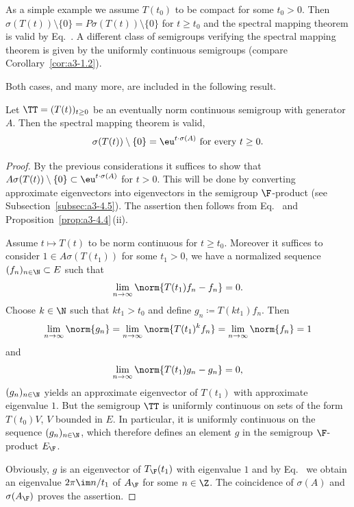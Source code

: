 As a simple example we assume $T(t_{0})$ to be compact for some $t_{0} > 0$.
Then $\sigma(T(t)) \setminus \{0\} = P\sigma(T(t)) \setminus \{0\}$ for $t \geq t_{0}$ and the spectral mapping theorem is valid by Eq.~.
A different class of semigroups verifying the spectral mapping theorem is given by the uniformly continuous semigroups (compare Corollary~\ref{cor:a3-1.2}).

Both cases, and many more, are included in the following result.
\begin{theorem}\label{thm:a3-6.6}%
Let $\TT = (T(t))_{t\geq 0}$ be an eventually norm continuous semigroup with generator $A$.
Then the spectral mapping theorem is valid, \ie 
\begin{equation}\label{eq:a3-6.6)}
	\sigma(T(t)) \setminus \{0\} = \eu^{t \cdot \sigma(A)} \text{ for every } t \geq 0 .
\end{equation}
\end{theorem}
\begin{proof}
By the previous considerations it suffices to show that $A\sigma(T(t)) \setminus \{0\} \subset \eu^{t \cdot \sigma(A)}$ for $t > 0$.
This will be done by converting approximate eigenvectors into eigenvectors in the semigroup $\F$-product (see Subsection~\ref{subsec:a3-4.5}).
The assertion then follows from Eq.~ and Proposition~\ref{prop:a3-4.4}\,(ii).

Assume $t \mapsto T(t)$ to be norm continuous for $t \geq t_{0}$.
Moreover it suffices to consider $1 \in A\sigma(T(t_{1}))$ for some $t_{1} > 0$, \ie we have a normalized sequence $(f_{n})_{n\in\N} \subset E$ such that
\[
\lim_{n\to\infty} \norm{T(t_{1})f_{n} - f_{n}} = 0 .
\]
Choose $k \in \N$ such that $kt_{1} > t_{0}$ and define $g_{n} \coloneqq T(kt_{1})f_{n}$.
Then
\[
\lim_{n\to\infty}\norm{g_{n}} = \lim_{n\to\infty}\norm{T(t_{1})^{k}f_{n}} = \lim_{n\to\infty}\norm{f_{n}} = 1
\]
and
\[
\lim_{n\to\infty} \norm{T(t_{1})g_{n} - g_{n}} = 0 ,
\]
\ie $(g_{n})_{n\in\N}$ yields an approximate eigenvector 
of\/ $T(t_{1})$ with approximate eigenvalue $1$.
But the semigroup $\TT$ is uniformly continuous on sets of the form $T(t_{0})V$, $V$ bounded in $E$.
In particular, it is uniformly continuous on the sequence $(g_{n})_{n\in\N}$, which therefore defines an element $g$ in the semigroup $\F$-product $E_{\F}$.

Obviously, $g$ is an eigenvector of\/ $T_{\F}(t_{1})$ with eigenvalue $1$ and by Eq.~ we obtain an eigenvalue $2\pi\im  n/t_{1}$ of\/ $A_{\F}$ for some $n \in \Z$.
The coincidence of\/ $\sigma(A)$ and $\sigma(A_{\F})$ proves the assertion.
\end{proof}
